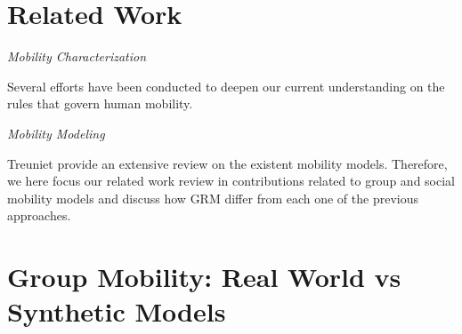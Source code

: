 \documentclass[10pt, conference, letterpaper]{IEEEtran}
\begin{document}
\section{Related Work}\label{related}

\textit{Mobility Characterization}

Several efforts have been conducted to deepen our current understanding on the rules that govern human mobility.



\textit{Mobility Modeling}

Treuniet \cite{survey1} provide an extensive review on the existent mobility models. Therefore, we here focus our related work review in contributions related to group and social mobility models and discuss how GRM differ from each one of the previous approaches. 





\section{Group Mobility: Real World vs Synthetic Models}
\end{document}
